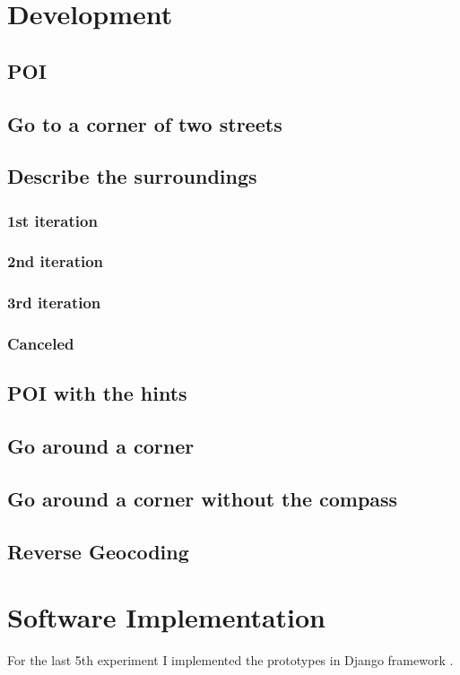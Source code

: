 \documentclass[11pt,oneside,a4paper]{book}
\begin{document}
	\chapter{Development}
		\section{POI}		
		\section{Go to a corner of two streets}		
		\section{Describe the surroundings}
			\subsection{1st iteration}		
			\subsection{2nd iteration}		
			\subsection{3rd iteration}		
			\subsection{Canceled}		
		\section{POI with the hints}
		\section{Go around a corner}
		\section{Go around a corner without the compass}
		\section{Reverse Geocoding}
		
		
				
	\chapter{Software Implementation}
		For the last 5th experiment I implemented the prototypes in  Django framework \cite{django}.
\end{document}
